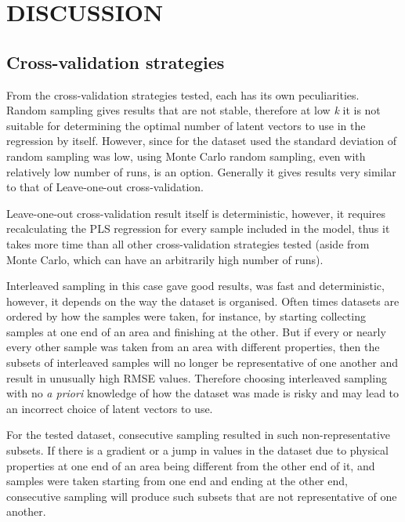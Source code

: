 \documentclass{isprs}
\begin{document}
\section{DISCUSSION}\label{sec:DISCUSSION}

\subsection{Cross-validation strategies}\label{sec:Cross-validation strategies 3}

From the cross-validation strategies tested, each has its own peculiarities. Random sampling gives results that are not stable, therefore at low \textit{k} it is not suitable for determining the optimal number of latent vectors to use in the regression by itself. However, since for the dataset used the standard deviation of random sampling was low, using Monte Carlo random sampling, even with relatively low number of runs, is an option. Generally it gives results very similar to that of Leave-one-out cross-validation.

Leave-one-out cross-validation result itself is deterministic, however, it requires recalculating the PLS regression for every sample included in the model, thus it takes more time than all other cross-validation strategies tested (aside from Monte Carlo, which can have an arbitrarily high number of runs).

Interleaved sampling in this case gave good results, was fast and deterministic, however, it depends on the way the dataset is organised. Often times datasets are ordered by how the samples were taken, for instance, by starting collecting samples at one end of an area and finishing at the other. But if every or nearly every other sample was taken from an area with different properties, then the subsets of interleaved samples will no longer be representative of one another and result in unusually high RMSE values. Therefore choosing interleaved sampling with no \textit{a priori} knowledge of how the dataset was made is risky and may lead to an incorrect choice of latent vectors to use.

For the tested dataset, consecutive sampling resulted in such non-representative subsets. If there is a gradient or a jump in values in the dataset due to physical properties at one end of an area being different from the other end of it, and samples were taken starting from one end and ending at the other end, consecutive sampling will produce such subsets that are not representative of one another.
\end{document}
